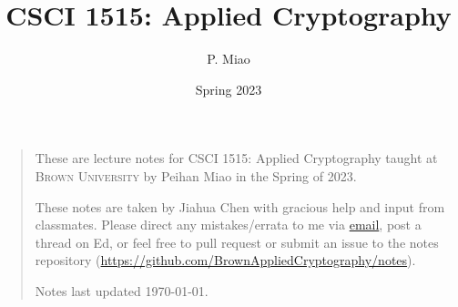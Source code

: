 \documentclass[letterpaper, 11pt, colorful, sections]{cs1515}
\title{CSCI 1515: Applied Cryptography}
\author{P. Miao}
\date{Spring 2023}
\numberwithin{equation}{section}
\begin{document}
\maketitle
\begin{quote}
    \quad These are lecture notes for CSCI 1515: Applied Cryptography taught at \textsc{Brown University} by Peihan Miao in the Spring of 2023.

    \quad These notes are taken by Jiahua Chen with gracious help and input from classmates. Please direct any mistakes/errata to me via \href{mailto:jiahua_chen2@brown.edu}{email}, post a thread on Ed, or feel free to pull request or submit an issue to the notes repository (\url{https://github.com/BrownAppliedCryptography/notes}).

    \quad Notes last updated \today.
\end{quote}
\tableofcontents
% 
% 

\newpage
% 
% 
% 

\end{document}
